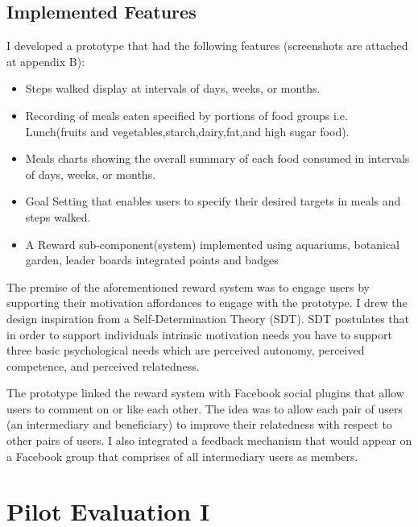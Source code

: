 \subsection{Implemented Features}
I developed a prototype that had the following features (screenshots are attached at appendix B):
\begin{itemize}
\item{Steps walked display at intervals of days, weeks, or months.}
\item{Recording of meals eaten specified by portions of food groups i.e. Lunch(fruits and vegetables,starch,dairy,fat,and high sugar food).}
\item{Meals charts showing the overall summary of each food consumed in intervals of days, weeks, or months.}
\item{Goal Setting that enables users to specify their desired targets in meals and steps walked.}
\item{A Reward sub-component(system) implemented using aquariums, botanical garden, leader boards integrated points and badges }
\end{itemize}
The premise of the aforementioned reward system was to engage users by supporting their motivation affordances\citep{zhang2008motivational} to engage with the prototype. I drew the design inspiration from a Self-Determination Theory (SDT)\citep{deci1985intrinsic}. SDT postulates that in order to support individuals intrinsic motivation needs you have to support three basic psychological needs which are perceived autonomy, perceived competence, and perceived relatedness. 

The prototype linked the reward system with Facebook social plugins that allow users to comment on or like each other. The idea was to allow each pair of users (an intermediary and beneficiary) to improve their relatedness with respect to other pairs of users. I also integrated a feedback mechanism that would appear on a Facebook group that comprises of all intermediary users as members. 


\section{Pilot Evaluation I}
